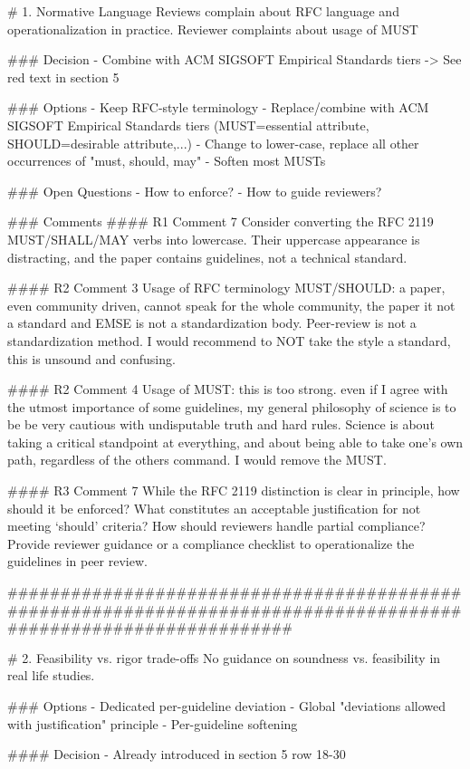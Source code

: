 # 1. Normative Language
Reviews complain about RFC language and operationalization in practice. Reviewer complaints about usage of MUST

### Decision
- Combine with ACM SIGSOFT Empirical Standards tiers -> See red text in section 5

### Options
- Keep RFC-style terminology
- Replace/combine with ACM SIGSOFT Empirical Standards tiers (MUST=essential attribute, SHOULD=desirable attribute,...)
- Change to lower-case, replace  all other occurrences of "must, should, may"
- Soften most MUSTs

### Open Questions
- How to enforce?
- How to guide reviewers?

### Comments
#### R1 Comment 7
Consider converting the RFC 2119 MUST/SHALL/MAY verbs into lowercase. Their uppercase appearance is distracting, and the paper contains guidelines, not a technical standard.

#### R2 Comment 3
Usage of RFC terminology MUST/SHOULD: a paper, even community driven, cannot speak for the whole community, the paper it not a standard and EMSE is not a standardization body. Peer-review is not a standardization method. I would recommend to NOT take the style a standard, this is unsound and confusing.

#### R2 Comment 4
Usage of MUST: this is too strong. even if I agree with the utmost importance of some guidelines, my general philosophy of science is to be be very cautious with undisputable truth and hard rules. Science is about taking a critical standpoint at everything, and about being able to take one's own path, regardless of the others command. I would remove the MUST.

#### R3 Comment 7
While the RFC 2119 distinction is clear in principle, how should it be enforced? What constitutes an acceptable justification for not meeting ‘should’ criteria? How should reviewers handle partial compliance? Provide reviewer guidance or a compliance checklist to operationalize the guidelines in peer review.


#################################################################################################################

# 2. Feasibility vs. rigor trade-offs
No guidance on soundness vs. feasibility in real life studies.

### Options
- Dedicated per-guideline deviation 
- Global "deviations allowed with justification" principle
- Per-guideline softening

#### Decision
- Already introduced in section 5 row 18-30

